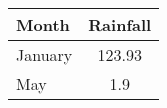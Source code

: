 \documentclass{article}
\begin{document}
\fontsize{40}{50}\selectfont 


\begin{tabular}{l c}
\hline 
Month   & Rainfall \\
\hline \hline
January & 123.93   \\
May     & 1.9      \\
\hline
\end{tabular}
\end{document}
